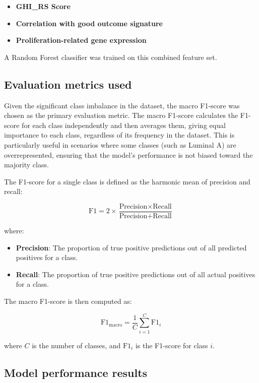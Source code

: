 \documentclass[conference]{IEEEtran}
\begin{document}
\begin{itemize}
    \item \textbf{GHI\_RS Score}
    \item \textbf{Correlation with good outcome signature}
    \item \textbf{Proliferation-related gene expression}
\end{itemize}

A Random Forest classifier was trained on this combined feature set.

\subsection{Evaluation metrics used} \label{f1}

Given the significant class imbalance in the dataset, the macro F1-score was chosen as the primary evaluation metric. The macro F1-score calculates the F1-score for each class independently and then averages them, giving equal importance to each class, regardless of its frequency in the dataset. This is particularly useful in scenarios where some classes (such as Luminal A) are overrepresented, ensuring that the model's performance is not biased toward the majority class.

The F1-score for a single class is defined as the harmonic mean of precision and recall:

\begin{equation}
\text{F1} = 2 \times \frac{\text{Precision} \times \text{Recall}}{\text{Precision} + \text{Recall}}
\end{equation}

where:
\begin{itemize}
    \item \textbf{Precision}: The proportion of true positive predictions out of all predicted positives for a class.
    \item \textbf{Recall}: The proportion of true positive predictions out of all actual positives for a class.
\end{itemize}

The macro F1-score is then computed as:

\begin{equation}
\text{F1}_{\text{macro}} = \frac{1}{C} \sum_{i=1}^{C} \text{F1}_i
\end{equation}

where $C$ is the number of classes, and $\text{F1}_i$ is the F1-score for class $i$.

\subsection{Model performance results}
\end{document}
